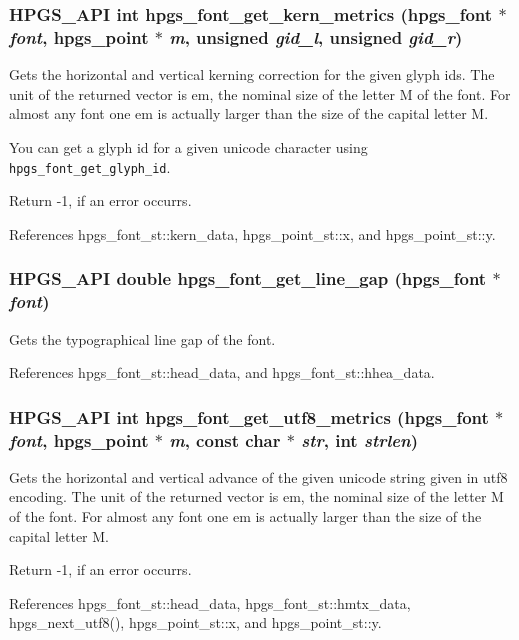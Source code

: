 \subsubsection[hpgs\_\-font\_\-get\_\-kern\_\-metrics]{\setlength{\rightskip}{0pt plus 5cm}HPGS\_\-API int hpgs\_\-font\_\-get\_\-kern\_\-metrics ({\bf hpgs\_\-font} $\ast$ {\em font}, \/  {\bf hpgs\_\-point} $\ast$ {\em m}, \/  unsigned {\em gid\_\-l}, \/  unsigned {\em gid\_\-r})}\label{group__font_g67bd79e5a342c97f302f96edd4064078}


Gets the horizontal and vertical kerning correction for the given glyph ids. The unit of the returned vector is em, the nominal size of the letter M of the font. For almost any font one em is actually larger than the size of the capital letter M.

You can get a glyph id for a given unicode character using {\tt hpgs\_\-font\_\-get\_\-glyph\_\-id}.

Return -1, if an error occurrs. 

References hpgs\_\-font\_\-st::kern\_\-data, hpgs\_\-point\_\-st::x, and hpgs\_\-point\_\-st::y.
\subsubsection[hpgs\_\-font\_\-get\_\-line\_\-gap]{\setlength{\rightskip}{0pt plus 5cm}HPGS\_\-API double hpgs\_\-font\_\-get\_\-line\_\-gap ({\bf hpgs\_\-font} $\ast$ {\em font})}\label{group__font_g77ba5973c88e0087b0f1ee41c37ff555}


Gets the typographical line gap of the font. 

References hpgs\_\-font\_\-st::head\_\-data, and hpgs\_\-font\_\-st::hhea\_\-data.
\subsubsection[hpgs\_\-font\_\-get\_\-utf8\_\-metrics]{\setlength{\rightskip}{0pt plus 5cm}HPGS\_\-API int hpgs\_\-font\_\-get\_\-utf8\_\-metrics ({\bf hpgs\_\-font} $\ast$ {\em font}, \/  {\bf hpgs\_\-point} $\ast$ {\em m}, \/  const char $\ast$ {\em str}, \/  int {\em strlen})}\label{group__font_gc2265b0afa11970e7d15dd0c746ce1a3}


Gets the horizontal and vertical advance of the given unicode string given in utf8 encoding. The unit of the returned vector is em, the nominal size of the letter M of the font. For almost any font one em is actually larger than the size of the capital letter M.

Return -1, if an error occurrs. 

References hpgs\_\-font\_\-st::head\_\-data, hpgs\_\-font\_\-st::hmtx\_\-data, hpgs\_\-next\_\-utf8(), hpgs\_\-point\_\-st::x, and hpgs\_\-point\_\-st::y.